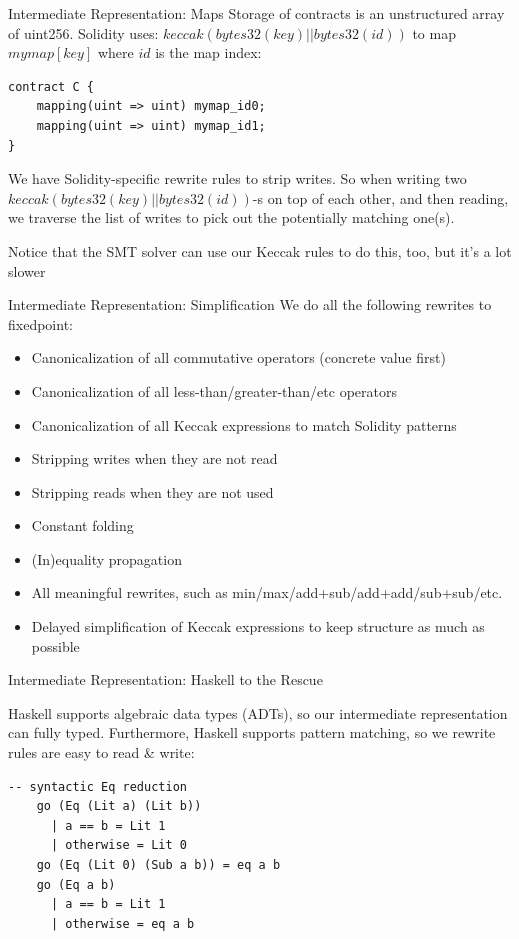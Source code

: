 \documentclass[aspectratio=169]{beamer}
\begin{document}
\begin{frame}[fragile=singleslide]{Intermediate Representation: Maps}
Storage of contracts is an unstructured array of uint256. Solidity uses: $keccak (bytes32(key) || bytes32(id))$ to map $mymap[key]$ where $id$ is the map index:

\begin{Verbatim}[frame=single, framerule=0.2mm, framesep=2mm,fontsize=\small]
contract C {
    mapping(uint => uint) mymap_id0;
    mapping(uint => uint) mymap_id1;
}
\end{Verbatim}
We have Solidity-specific rewrite rules to strip writes. So when writing two $keccak (bytes32(key) || bytes32(id))$-s on top of each other, and then reading, we traverse the list of writes to pick out the potentially matching one(s).
\bigskip

Notice that the SMT solver can use our Keccak rules to do this, too, but it's a lot slower
\end{frame}

\begin{frame}[fragile=singleslide]{Intermediate Representation: Simplification} 
We do all the following rewrites to fixedpoint:
\begin{itemize}
\item Canonicalization of all commutative operators (concrete value first)
\item Canonicalization of all less-than/greater-than/etc operators
\item Canonicalization of all Keccak expressions to match Solidity patterns
\item Stripping writes when they are not read
\item Stripping reads when they are not used
\item Constant folding
\item (In)equality propagation
\item All meaningful rewrites, such as min/max/add+sub/add+add/sub+sub/etc.
\item Delayed simplification of Keccak expressions to keep structure as much as possible
\end{itemize}
\end{frame}

\begin{frame}[fragile=singleslide]{Intermediate Representation: Haskell to the Rescue}

Haskell supports algebraic data types (ADTs), so our intermediate representation can fully typed. Furthermore, Haskell supports pattern matching, so we rewrite rules are easy to read \& write:
\begin{Verbatim}[frame=single, framerule=0.2mm, framesep=2mm,fontsize=\small]
    -- syntactic Eq reduction
    go (Eq (Lit a) (Lit b))
      | a == b = Lit 1
      | otherwise = Lit 0
    go (Eq (Lit 0) (Sub a b)) = eq a b
    go (Eq a b)
      | a == b = Lit 1
      | otherwise = eq a b
\end{Verbatim}
\end{frame}
\end{document}

